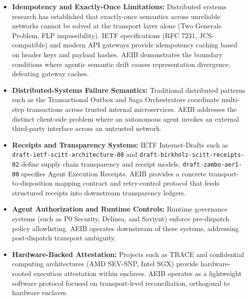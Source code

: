 \documentclass[10pt,journal,compsoc]{IEEEtran}
\begin{document}
\begin{itemize}
    \item \textbf{Idempotency and Exactly-Once Limitations:} Distributed systems research has established that exactly-once semantics across unreliable networks cannot be solved at the transport layer alone (Two Generals Problem, FLP impossibility). IETF specifications (RFC 7231, JCS-compatible) and modern API gateways provide idempotency caching based on header keys and payload hashes. AEIB demonstrates the boundary conditions where agentic semantic drift causes representation divergence, defeating gateway caches.
    \item \textbf{Distributed-Systems Failure Semantics:} Traditional distributed patterns such as the Transactional Outbox and Saga Orchestrators coordinate multi-step transactions across trusted internal microservices. AEIB addresses the distinct client-side problem where an autonomous agent invokes an external third-party interface across an untrusted network.
    \item \textbf{Receipts and Transparency Systems:} IETF Internet-Drafts such as \texttt{draft-ietf-scitt-architecture-08} and \texttt{draft-birkholz-scitt-receipts-02} define supply chain transparency and receipt models. \texttt{draft-zambo-aer1-00} specifies Agent Execution Receipts. AEIB provides a concrete transport-to-disposition mapping contract and retry-control protocol that feeds structured receipts into downstream transparency ledgers.
    \item \textbf{Agent Authorization and Runtime Controls:} Runtime governance systems (such as P0 Security, Delinea, and Saviynt) enforce pre-dispatch policy allowlisting. AEIB operates downstream of these systems, addressing post-dispatch transport ambiguity.
    \item \textbf{Hardware-Backed Attestation:} Projects such as TRACE and confidential computing architectures (AMD SEV-SNP, Intel SGX) provide hardware-rooted execution attestation within enclaves. AEIB operates as a lightweight software protocol focused on transport-level reconciliation, orthogonal to hardware enclaves.
\end{itemize}
\end{document}
